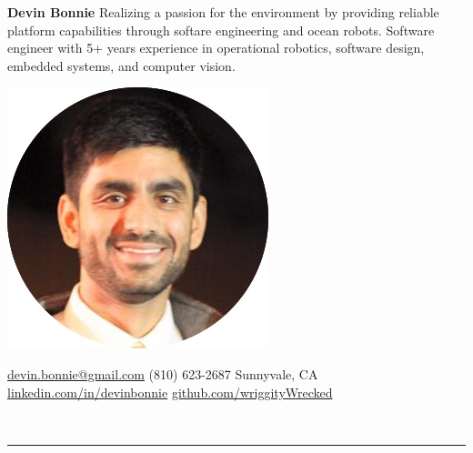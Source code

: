 \documentclass{article}
\begin{document}
\renewcommand{\labelitemi}{\tiny$\bullet$}
{
\hspace{-12px}
\begin{minipage}[t]{0.33\textwidth}
\begin{flushleft}
\noindent
\textbf{\huge{Devin Bonnie}}
\vspace{10px}
\linebreak
\noindent
\small{Realizing a passion for the environment by providing reliable platform capabilities through softare engineering and ocean robots. Software engineer with 5+ years experience in operational robotics, software design, embedded systems, and computer vision.}
\vspace*{1\baselineskip}
\end{flushleft}
\end{minipage}
\begin{minipage}[c]{0.33\textwidth}
\begin{center}
\includegraphics[trim= 0cm 8cm 0 0cm,scale=0.33]{dbCircle}
\end{center}
\end{minipage}
\begin{minipage}[t]{0.33\textwidth}
\begin{flushright}
\vspace*{1\baselineskip}
\href{mailto:devin.bonnie@gmail.com}{devin.bonnie@gmail.com} 
 \vspace{1px}
\linebreak
(810) 623-2687
 \vspace{1px}
\linebreak
Sunnyvale, CA 
 \vspace{1px}
\linebreak
\href{https://www.linkedin.com/in/devinbonnie}{linkedin.com/in/devinbonnie}
\linebreak
\href{https://github.com/wriggityWrecked}{github.com/wriggityWrecked}
\linebreak
\end{flushright}
\end{minipage}
%
\linebreak
\vspace{0px}\\
\vspace{-2px}\textcolor{lightGray}{\rule{542px}{0.4pt}}

}
\end{document}
